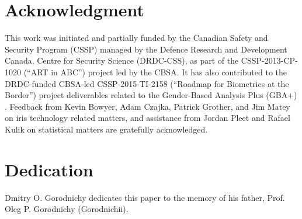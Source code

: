 \documentclass{cta-author}%
\newcommand{\cmt}[1]{}
\begin{document}
\cmt{
Then the performance can be further optimized by applying different matching decision or process rules for different age group populations, e.g., 
a higher threshold or a larger number of attempts for old and young subjects,
or matching score normalization formula can be further improved, as mentioned in this paper, to take into account person's age and other image quality metrics (Subject factor).
}




\section*{Acknowledgment}

This work was initiated and partially funded by the Canadian Safety and Security Program (CSSP) managed by the Defence Research and Development Canada,  Centre for Security Science (DRDC-CSS), as part of the CSSP-2013-CP-1020 (``ART in ABC'') project \cite{GorodnichyARTinABC} led by the CBSA. It has also contributed to the DRDC-funded CBSA-led CSSP-2015-TI-2158 (``Roadmap for Biometrics at the Border'') project deliverables related to the Gender-Based Analysis Plus (GBA+) \cite{GBA}.
Feedback from  Kevin Bowyer, Adam Czajka,  Patrick Grother, and Jim Matey on iris technology related matters, and assistance from Jordan Pleet and 
Rafael Kulik on statistical matters are  gratefully acknowledged.


\section*{Dedication}
Dmitry O. Gorodnichy dedicates this paper to the memory of his father, Prof. Oleg P. Gorodnichy (Gorodnichii).







\end{document}
